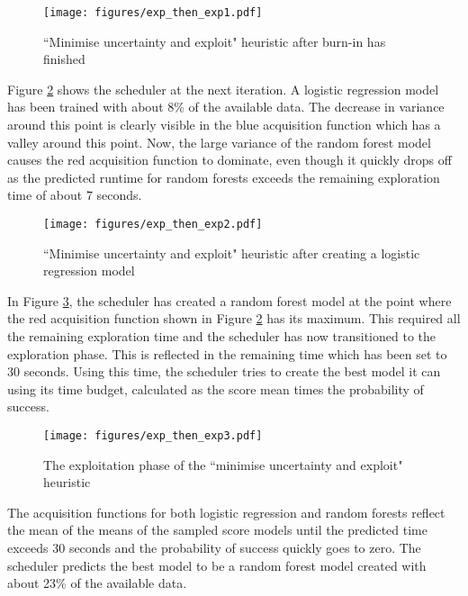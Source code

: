 \documentclass[a4paper,12pt,twoside,openright]{report}
\begin{document}
\begin{figure}
\centering
  \texttt{[image: figures/exp\_then\_exp1.pdf]}
  \caption{``Minimise uncertainty and exploit" heuristic after burn-in has finished}
  \label{sched:exp_then_exp1}
\end{figure}

Figure \ref{sched:exp_then_exp2} shows the scheduler at the next iteration. A logistic regression model has been trained with about 8\% of the available data. The decrease in variance around this point is clearly visible in the blue acquisition function which has a valley around this point. Now, the large variance of the random forest model causes the red acquisition function to dominate, even though it quickly drops off as the predicted runtime for random forests exceeds the remaining exploration time of about 7 seconds.

\begin{figure}
\centering
  \texttt{[image: figures/exp\_then\_exp2.pdf]}
  \caption{``Minimise uncertainty and exploit" heuristic after creating a logistic regression model}
  \label{sched:exp_then_exp2}
\end{figure}


In Figure \ref{sched:exp_then_exp3}, the scheduler has created a random forest model at the point where the red acquisition function shown in Figure \ref{sched:exp_then_exp2} has its maximum. This required all the remaining exploration time and the scheduler has now transitioned to the exploration phase. This is reflected in the remaining time which has been set to 30 seconds. Using this time, the scheduler tries to create the best model it can using its time budget, calculated as the score mean times the probability of success.

\begin{figure}[h]
\centering
  \texttt{[image: figures/exp\_then\_exp3.pdf]}
  \caption{The exploitation phase of the ``minimise uncertainty and exploit" heuristic}
  \label{sched:exp_then_exp3}
\end{figure}

The acquisition functions for both logistic regression and random forests reflect the mean of the means of the sampled score models until the predicted time exceeds 30 seconds and the probability of success quickly goes to zero. The scheduler predicts the best model to be a random forest model created with about 23\% of the available data.
\end{document}
